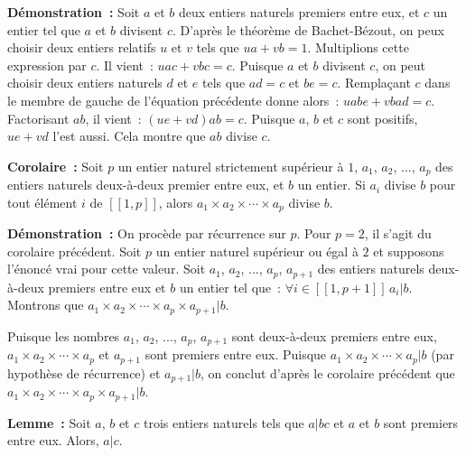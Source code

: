 \medskip

\noindent\textbf{Démonstration :} 
    Soit $a$ et $b$ deux entiers naturels premiers entre eux, et $c$ un entier tel que $a$ et $b$ divisent $c$.
    D'après le théorème de Bachet-Bézout, on peux choisir deux entiers relatifs $u$ et $v$ tels que $u a + v b = 1$. 
    Multiplions cette expression par $c$. Il vient : $u a c + v b c = c$. 
    Puisque $a$ et $b$ divisent $c$, on peut choisir deux entiers naturels $d$ et $e$ tels que $a d = c$ et $b e = c$. 
    Remplaçant $c$ dans le membre de gauche de l'équation précédente donne alors : $u a b e + v b a d = c$. 
    Factorisant $a b$, il vient : $(u e + v d) a b = c$. 
    Puisque $a$, $b$ et $c$ sont positifs, $u e + v d$ l'est aussi. 
    Cela montre que $a b$ divise $c$. 

\done

\medskip 

\noindent\textbf{Corolaire :} Soit $p$ un entier naturel strictement supérieur à $1$, $a_1$, $a_2$, ..., $a_p$ des entiers naturels deux-à-deux premier entre eux, et $b$ un entier. Si $a_i$ divise $b$ pour tout élément $i$ de $[\![1,p]\!]$, alors $a_1 \times a_2 \times \cdots \times a_p$ divise $b$.

\medskip

\noindent\textbf{Démonstration :} On procède par récurrence sur $p$. 
    Pour $p = 2$, il s'agit du corolaire précédent.
    Soit $p$ un entier naturel supérieur ou égal à $2$ et supposons l'énoncé vrai pour cette valeur. 
    Soit $a_1$, $a_2$, ..., $a_p$, $a_{p+1}$ des entiers naturels deux-à-deux premiers entre eux et $b$ un entier tel que : $\forall i \in [\![1, p+1]\!] \, a_i \vert b$. 
    Montrons que $a_1 \times a_2 \times \cdots \times a_p \times a_{p+1} \vert b$.

    Puisque les nombres $a_1$, $a_2$, ..., $a_p$, $a_{p+1}$ sont deux-à-deux premiers entre eux, $a_1 \times a_2 \times \cdots \times a_p$ et $a_{p+1}$ sont premiers entre eux. 
    Puisque $a_1 \times a_2 \times \cdots \times a_p \vert b$ (par hypothèse de récurrence) et $a_{p+1} \vert b$, on conclut d'après le corolaire précédent que $a_1 \times a_2 \times \cdots \times a_p \times a_{p+1} \vert b$.

    \done

\medskip

\noindent\textbf{Lemme :} Soit $a$, $b$ et $c$ trois entiers naturels tels que $a \vert b c$ et $a$ et $b$ sont premiers entre eux. 
    Alors, $a \vert c$.

\medskip

